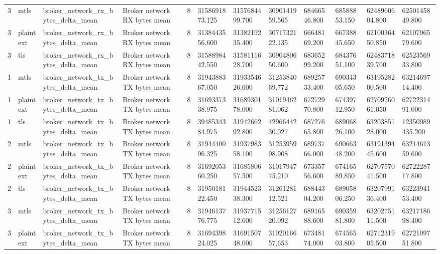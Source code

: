 \begin{longtable}{llllllllllll}
3 & mtls & broker\_network\_rx\_bytes\_delta\_mean & Broker network RX bytes mean & 8 & 3158691873.125 & 3157684499.700 & 3090141959.565 & 68466546.800 & 68588853.150 & 6248960604.800 & 6250145849.800 \\
3 & plaintext & broker\_network\_rx\_bytes\_delta\_mean & Broker network RX bytes mean & 8 & 3138443556.600 & 3138219235.400 & 3071732122.135 & 66648169.200 & 66738845.650 & 6210036450.850 & 6210796579.600 \\
3 & tls & broker\_network\_rx\_bytes\_delta\_mean & Broker network RX bytes mean & 8 & 3158898442.550 & 3158111628.700 & 3090480650.600 & 68365299.200 & 68437651.100 & 6248371839.700 & 6252356933.800 \\
1 & mtls & broker\_network\_tx\_bytes\_delta\_mean & Broker network TX bytes mean & 8 & 3194388367.050 & 3193354626.600 & 3125384069.772 & 68925733.400 & 69034305.650 & 6319528200.500 & 6321469714.400 \\
1 & plaintext & broker\_network\_tx\_bytes\_delta\_mean & Broker network TX bytes mean & 8 & 3169337338.975 & 3168930178.000 & 3101946281.062 & 67272970.800 & 67439712.950 & 6270926061.050 & 6272231491.000 \\
1 & tls & broker\_network\_tx\_bytes\_delta\_mean & Broker network TX bytes mean & 8 & 3948534384.975 & 3194266292.800 & 4296644230.027 & 68727665.800 & 68906826.100 & 6320385128.000 & 12350989435.200 \\
2 & mtls & broker\_network\_tx\_bytes\_delta\_mean & Broker network TX bytes mean & 8 & 3194440096.325 & 3193798358.100 & 3125395998.908 & 68973766.000 & 69066348.200 & 6319139445.600 & 6321461359.600 \\
2 & plaintext & broker\_network\_tx\_bytes\_delta\_mean & Broker network TX bytes mean & 8 & 3169205360.250 & 3168580657.500 & 3101794775.210 & 67335756.600 & 67416589.850 & 6270757041.500 & 6272228717.800 \\
2 & tls & broker\_network\_tx\_bytes\_delta\_mean & Broker network TX bytes mean & 8 & 3195018122.450 & 3194452338.300 & 3126128112.521 & 68844304.200 & 68905806.250 & 6320799136.400 & 6322394153.400 \\
3 & mtls & broker\_network\_tx\_bytes\_delta\_mean & Broker network TX bytes mean & 8 & 3194613776.775 & 3193771512.600 & 3125612720.092 & 68916588.600 & 69035981.800 & 6320275111.500 & 6321718698.400 \\
3 & plaintext & broker\_network\_tx\_bytes\_delta\_mean & Broker network TX bytes mean & 8 & 3169439824.025 & 3169150748.000 & 3102016657.653 & 67348174.000 & 67456503.800 & 6271231905.500 & 6272109751.800 \\

\end{longtable}
